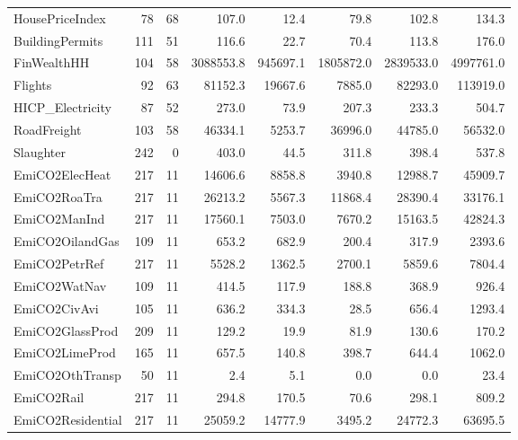 {\begin{tabular}[t]{lrrrrrrr}
HousePriceIndex & 78 & 68 & \num{107.0} & \num{12.4} & \num{79.8} & \num{102.8} & \num{134.3}\\
BuildingPermits & 111 & 51 & \num{116.6} & \num{22.7} & \num{70.4} & \num{113.8} & \num{176.0}\\
FinWealthHH & 104 & 58 & \num{3088553.8} & \num{945697.1} & \num{1805872.0} & \num{2839533.0} & \num{4997761.0}\\
Flights & 92 & 63 & \num{81152.3} & \num{19667.6} & \num{7885.0} & \num{82293.0} & \num{113919.0}\\
HICP\_Electricity & 87 & 52 & \num{273.0} & \num{73.9} & \num{207.3} & \num{233.3} & \num{504.7}\\
RoadFreight & 103 & 58 & \num{46334.1} & \num{5253.7} & \num{36996.0} & \num{44785.0} & \num{56532.0}\\
Slaughter & 242 & 0 & \num{403.0} & \num{44.5} & \num{311.8} & \num{398.4} & \num{537.8}\\
EmiCO2ElecHeat & 217 & 11 & \num{14606.6} & \num{8858.8} & \num{3940.8} & \num{12988.7} & \num{45909.7}\\
EmiCO2RoaTra & 217 & 11 & \num{26213.2} & \num{5567.3} & \num{11868.4} & \num{28390.4} & \num{33176.1}\\
EmiCO2ManInd & 217 & 11 & \num{17560.1} & \num{7503.0} & \num{7670.2} & \num{15163.5} & \num{42824.3}\\
EmiCO2OilandGas & 109 & 11 & \num{653.2} & \num{682.9} & \num{200.4} & \num{317.9} & \num{2393.6}\\
EmiCO2PetrRef & 217 & 11 & \num{5528.2} & \num{1362.5} & \num{2700.1} & \num{5859.6} & \num{7804.4}\\
EmiCO2WatNav & 109 & 11 & \num{414.5} & \num{117.9} & \num{188.8} & \num{368.9} & \num{926.4}\\
EmiCO2CivAvi & 105 & 11 & \num{636.2} & \num{334.3} & \num{28.5} & \num{656.4} & \num{1293.4}\\
EmiCO2GlassProd & 209 & 11 & \num{129.2} & \num{19.9} & \num{81.9} & \num{130.6} & \num{170.2}\\
EmiCO2LimeProd & 165 & 11 & \num{657.5} & \num{140.8} & \num{398.7} & \num{644.4} & \num{1062.0}\\
EmiCO2OthTransp & 50 & 11 & \num{2.4} & \num{5.1} & \num{0.0} & \num{0.0} & \num{23.4}\\
EmiCO2Rail & 217 & 11 & \num{294.8} & \num{170.5} & \num{70.6} & \num{298.1} & \num{809.2}\\
EmiCO2Residential & 217 & 11 & \num{25059.2} & \num{14777.9} & \num{3495.2} & \num{24772.3} & \num{63695.5}\\

\end{tabular}}
